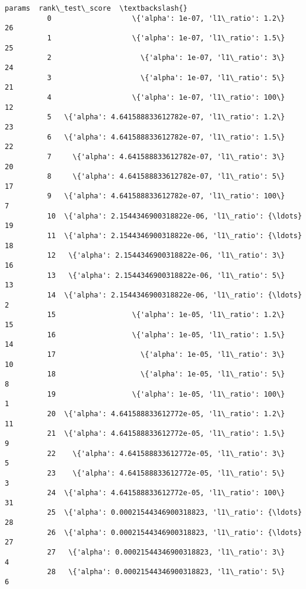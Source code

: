 \documentclass[11pt]{article}
\begin{document}
\begin{Verbatim}[commandchars=\\\{\}]
                                                         params  rank\_test\_score  \textbackslash{}
          0                   \{'alpha': 1e-07, 'l1\_ratio': 1.2\}               26   
          1                   \{'alpha': 1e-07, 'l1\_ratio': 1.5\}               25   
          2                     \{'alpha': 1e-07, 'l1\_ratio': 3\}               24   
          3                     \{'alpha': 1e-07, 'l1\_ratio': 5\}               21   
          4                   \{'alpha': 1e-07, 'l1\_ratio': 100\}               12   
          5   \{'alpha': 4.641588833612782e-07, 'l1\_ratio': 1.2\}               23   
          6   \{'alpha': 4.641588833612782e-07, 'l1\_ratio': 1.5\}               22   
          7     \{'alpha': 4.641588833612782e-07, 'l1\_ratio': 3\}               20   
          8     \{'alpha': 4.641588833612782e-07, 'l1\_ratio': 5\}               17   
          9   \{'alpha': 4.641588833612782e-07, 'l1\_ratio': 100\}                7   
          10  \{'alpha': 2.1544346900318822e-06, 'l1\_ratio': {\ldots}               19   
          11  \{'alpha': 2.1544346900318822e-06, 'l1\_ratio': {\ldots}               18   
          12   \{'alpha': 2.1544346900318822e-06, 'l1\_ratio': 3\}               16   
          13   \{'alpha': 2.1544346900318822e-06, 'l1\_ratio': 5\}               13   
          14  \{'alpha': 2.1544346900318822e-06, 'l1\_ratio': {\ldots}                2   
          15                  \{'alpha': 1e-05, 'l1\_ratio': 1.2\}               15   
          16                  \{'alpha': 1e-05, 'l1\_ratio': 1.5\}               14   
          17                    \{'alpha': 1e-05, 'l1\_ratio': 3\}               10   
          18                    \{'alpha': 1e-05, 'l1\_ratio': 5\}                8   
          19                  \{'alpha': 1e-05, 'l1\_ratio': 100\}                1   
          20  \{'alpha': 4.641588833612772e-05, 'l1\_ratio': 1.2\}               11   
          21  \{'alpha': 4.641588833612772e-05, 'l1\_ratio': 1.5\}                9   
          22    \{'alpha': 4.641588833612772e-05, 'l1\_ratio': 3\}                5   
          23    \{'alpha': 4.641588833612772e-05, 'l1\_ratio': 5\}                3   
          24  \{'alpha': 4.641588833612772e-05, 'l1\_ratio': 100\}               31   
          25  \{'alpha': 0.00021544346900318823, 'l1\_ratio': {\ldots}               28   
          26  \{'alpha': 0.00021544346900318823, 'l1\_ratio': {\ldots}               27   
          27   \{'alpha': 0.00021544346900318823, 'l1\_ratio': 3\}                4   
          28   \{'alpha': 0.00021544346900318823, 'l1\_ratio': 5\}                6   

\end{Verbatim}
\end{document}
